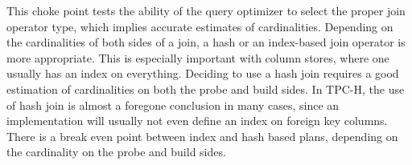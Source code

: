 
This choke point tests the ability of the query optimizer to select the proper
join operator type, which implies accurate estimates of cardinalities. Depending
on the cardinalities of both sides of a join, a hash or an index-based join
operator is more appropriate. This is especially important with column stores,
where one usually has an index on everything. Deciding to use a hash join
requires a good estimation of cardinalities on both the probe and build sides.
In TPC-H, the use of hash join is almost a foregone conclusion in many cases,
since an implementation will usually not even define an index on foreign key
columns. There is a break even point between index and hash based plans,
depending on the cardinality on the probe and build sides.


